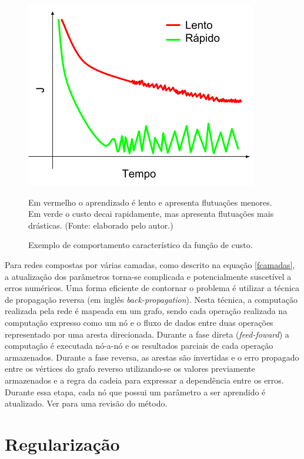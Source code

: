 \begin{figure}[ht]
	\caption{Exemplo de comportamento característico da função de custo.}
	\begin{center}
	\includegraphics[width=.6\linewidth]{figuras/convergence.png}
	\end{center}
	\small Em vermelho o aprendizado é lento e apresenta flutuações menores. Em verde o custo decai rapidamente, mas apresenta flutuações mais drásticas. (Fonte: elaborado pelo autor.)
	\label{convergence}
\end{figure}


Para redes compostas por várias camadas, como descrito na equação \ref{fcamadas}, a atualização dos parâmetros torna-se complicada e potencialmente suscetível a erros numéricos. Uma forma eficiente de contornar o problema é utilizar a técnica de propagação reversa (em inglês \textit{back-propagation}). Nesta técnica, a computação realizada pela rede é mapeada em um grafo, sendo cada operação realizada na computação expresso como um nó e o fluxo de dados entre duas operações representado por uma aresta direcionada. Durante a fase direta (\textit{feed-foward}) a computação é executada nó-a-nó e os resultados parciais de cada operação armazenados. Durante a fase reversa, as arestas são invertidas e o erro propagado entre os vértices do grafo reverso utilizando-se os valores previamente armazenados e a regra da cadeia para expressar a dependência entre os erros. Durante essa etapa, cada nó que possui um parâmetro a ser aprendido é atualizado. Ver \cite{jurgenReview2015} para uma revisão do método.


\section{Regularização}

